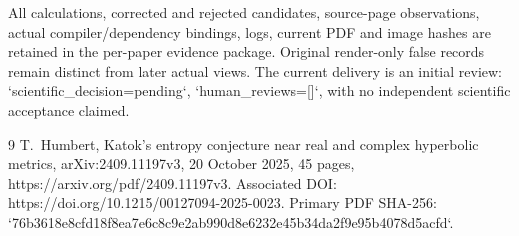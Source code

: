 \documentclass[10pt]{article}
\begin{document}
All calculations, corrected and rejected candidates, source-page observations, actual compiler/dependency bindings, logs, current PDF and image hashes are retained in the per-paper evidence package. Original render-only false records remain distinct from later actual views. The current delivery is an initial review: `scientific\_decision=pending`, `human\_reviews=[]`, with no independent scientific acceptance claimed.\par
9 T. Humbert, Katok’s entropy conjecture near real and complex hyperbolic metrics, arXiv:2409.11197v3, 20 October 2025, 45 pages, https://arxiv.org/pdf/2409.11197v3. Associated DOI: https://doi.org/10.1215/00127094-2025-0023. Primary PDF SHA-256: `76b3618e8cfd18f8ea7e6c8c9e2ab990d8e6232e45b34da2f9e95b4078d5acfd`.\par
\end{document}
